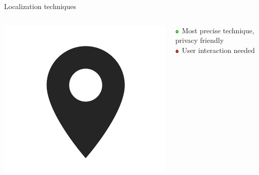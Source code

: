 \documentclass[11pt]{beamer}
\begin{document}
\begin{frame}{Localization techniques}

  \begin{columns}

    \begin{column}{0.2\textwidth}
      \includegraphics[width=\textwidth]{location-symbol}
    \end{column}

    \hfill

    \begin{column}{0.8\textwidth}

      \includegraphics[width=0.05\textwidth]{plus} Most precise technique, privacy friendly\\
      \includegraphics[width=0.05\textwidth]{minus} User interaction needed

    \end{column}

  \end{columns}

  \begin{columns}

    \begin{column}{0.65\textwidth}


\end{column}
\end{columns}
\end{frame}
\end{document}
